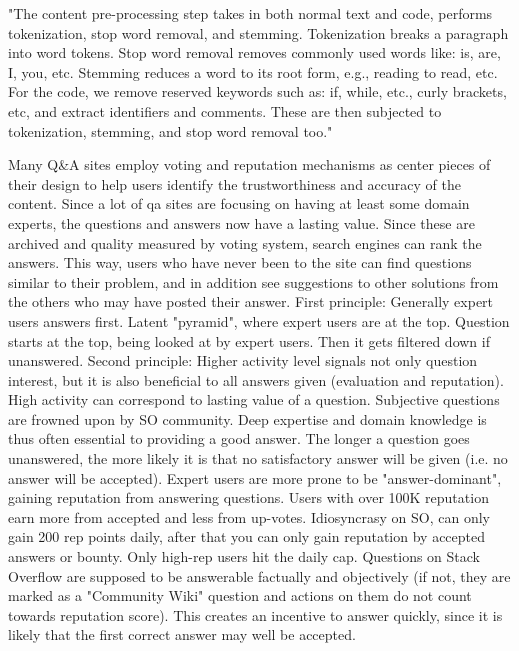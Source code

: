 "The content pre-processing step takes in both normal text and code, performs tokenization, stop word removal, and stemming. Tokenization breaks a paragraph into word tokens. Stop word removal removes commonly used words like: is, are, I, you, etc. Stemming reduces a word to its root form, e.g., reading to read, etc. For the code, we remove reserved keywords such as: if, while, etc., curly brackets, etc, and extract identifiers and comments. These are then subjected to tokenization, stemming, and stop word removal too."
\cite{Wang2013}

Many Q\&A sites employ voting and reputation mechanisms as center pieces of their design to help users identify the trustworthiness and accuracy of the content. Since a lot of qa sites are focusing on having at least some domain experts, the questions and answers now have a lasting value. Since these are archived and quality measured by voting system, search engines can rank the answers. This way, users who have never been to the site can find questions similar to their problem, and in addition see suggestions to other solutions from the others who may have posted their answer.
First principle:
Generally expert users answers first. Latent "pyramid", where expert users are at the top. Question starts at the top, being looked at by expert users. Then it gets filtered down if unanswered.
Second principle:
Higher activity level signals not only question interest, but it is also beneficial to all answers given (evaluation and reputation). High activity can correspond to lasting value of a question. Subjective questions are frowned upon by SO community. Deep expertise and domain knowledge is thus often essential to providing a good answer. 
The longer a question goes unanswered, the more likely it is that no satisfactory answer will be given (i.e. no answer will be accepted).  Expert users are more prone to be "answer-dominant", gaining reputation from answering questions. Users with over 100K reputation earn more from accepted and less from up-votes. Idiosyncrasy on SO, can only gain 200 rep points daily, after that you can only gain reputation by accepted answers or bounty. Only high-rep users hit the daily cap.
Questions on Stack Overflow are supposed to be answerable factually and objectively (if not, they are marked as a "Community Wiki" question and actions on them do not count towards reputation score). This creates an incentive to answer quickly, since it is likely that the first correct answer may well be accepted.
\cite{Anderson2012}

